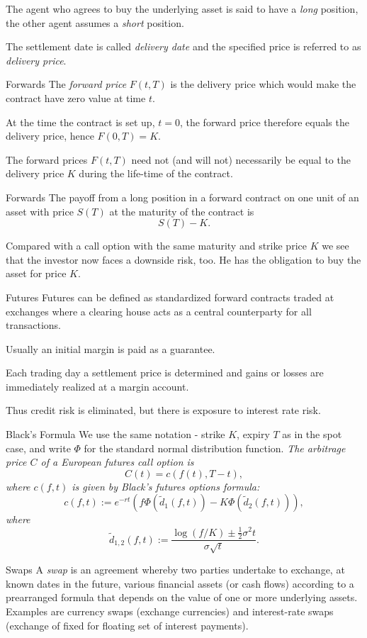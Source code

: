 	The agent who agrees to buy the underlying asset is said to have a {\it long} position,
	the other agent assumes a {\it short} position.
 
	The settlement date is called {\it delivery date} and the specified price is
	referred to as {\it delivery price}.


Forwards
	The {\it forward price} $F(t,T)$ is the delivery price which would make the
	contract have zero value at time $t$.
	
	At the time the contract is set up, $t=0$, the forward price therefore equals the
	delivery price, hence $F(0,T) = K$.

	The forward prices $F(t,T)$ need not (and will not)
	necessarily be equal to the delivery price $K$ during the
	life-time of the contract.


Forwards
	The payoff from a long position in a forward contract on one unit
	of an asset with price $S(T)$ at the maturity of the contract is
	$$ S(T)-K.$$
 
	Compared with a call option with the same maturity
	and strike price $K$ we see that the investor now faces a downside
	risk, too. He has the obligation to buy the asset for price $K$.


Futures
	Futures can be defined as standardized forward contracts traded at exchanges where a clearing house acts as a central counterparty for all transactions.
	
	Usually an initial margin is paid as a guarantee.
	
	Each trading day a settlement price is determined and gains or losses are immediately realized at a margin account.
	
	Thus credit risk is eliminated, but there is exposure to interest rate risk.


Black's Formula
	We use the same notation -
	strike $K$, expiry $T$ as in the spot case, and write $\Phi$ for the
	standard normal distribution function.
	{\it
	The arbitrage price $C$ of a European futures call option is
	$$
	C(t)= c(f(t), T-t),
	$$
	where $c(f,t)$ is given by Black's futures options formula:
	$$
	c(f,t) := e^{-rt} (f \Phi(\tilde{d}_1 (f,t)) - K \Phi(\tilde{d}_2 (f,t))),
	$$
	where
	$$
	\tilde{d}_{1,2} (f,t) := \frac{\log (f/K) \pm \frac{1}{2} {\sigma}^2 t}{
	\sigma \sqrt{t}}.
	$$
	}


Swaps
	A {\it swap} is an agreement whereby two parties
	undertake to exchange, at known dates in the future, various
	financial assets (or cash flows) according to a prearranged
	formula that depends on the value of one or more underlying
	assets. Examples are currency swaps (exchange currencies) and
	interest-rate swaps (exchange of fixed for floating set of
	interest payments).


